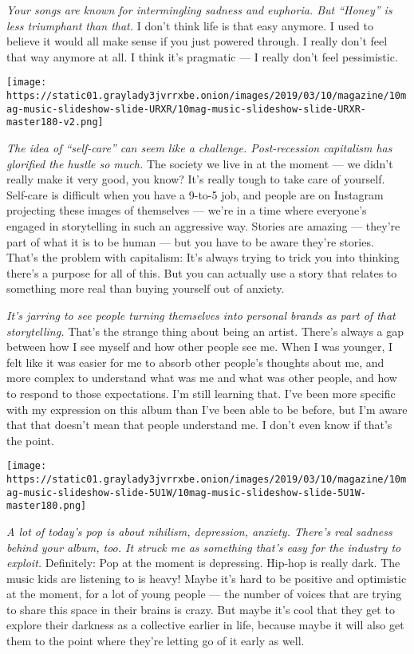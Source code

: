 \emph{Your songs are known for intermingling sadness and euphoria. But
``Honey'' is less triumphant than that.} I don't think life is that easy
anymore. I used to believe it would all make sense if you just powered
through. I really don't feel that way anymore at all. I think it's
pragmatic --- I really don't feel pessimistic.

\texttt{[image: https://static01.graylady3jvrrxbe.onion/images/2019/03/10/magazine/10mag-music-slideshow-slide-URXR/10mag-music-slideshow-slide-URXR-master180-v2.png]}

\emph{The idea of ``self-care'' can seem like a challenge.
Post-recession capitalism has glorified the hustle so much.} The society
we live in at the moment --- we didn't really make it very good, you
know? It's really tough to take care of yourself. Self-care is difficult
when you have a 9-to-5 job, and people are on Instagram projecting these
images of themselves --- we're in a time where everyone's engaged in
storytelling in such an aggressive way. Stories are amazing --- they're
part of what it is to be human --- but you have to be aware they're
stories. That's the problem with capitalism: It's always trying to trick
you into thinking there's a purpose for all of this. But you can
actually use a story that relates to something more real than buying
yourself out of anxiety.

\emph{It's jarring to see people turning themselves into personal brands
as part of that storytelling.} That's the strange thing about being an
artist. There's always a gap between how I see myself and how other
people see me. When I was younger, I felt like it was easier for me to
absorb other people's thoughts about me, and more complex to understand
what was me and what was other people, and how to respond to those
expectations. I'm still learning that. I've been more specific with my
expression on this album than I've been able to be before, but I'm aware
that that doesn't mean that people understand me. I don't even know if
that's the point.

\texttt{[image: https://static01.graylady3jvrrxbe.onion/images/2019/03/10/magazine/10mag-music-slideshow-slide-5U1W/10mag-music-slideshow-slide-5U1W-master180.png]}

\emph{A lot of today's pop is about nihilism, depression, anxiety.
There's real sadness behind your album, too. It struck me as something
that's easy for the industry to exploit.} Definitely: Pop at the moment
is depressing. Hip-hop is really dark. The music kids are listening to
is heavy! Maybe it's hard to be positive and optimistic at the moment,
for a lot of young people --- the number of voices that are trying to
share this space in their brains is crazy. But maybe it's cool that they
get to explore their darkness as a collective earlier in life, because
maybe it will also get them to the point where they're letting go of it
early as well.

